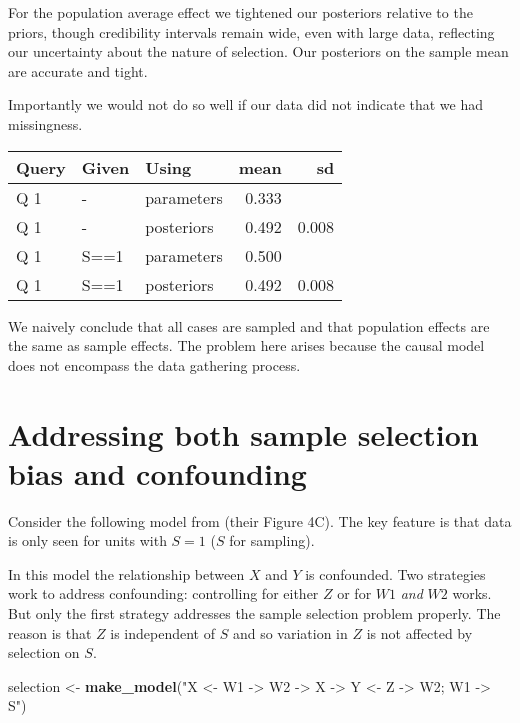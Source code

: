 \documentclass[
  12pt,
]{book}
\newenvironment{Shaded}{\begin{snugshade}}{\end{snugshade}}
\newcommand{\KeywordTok}[1]{\textcolor[rgb]{0.13,0.29,0.53}{\textbf{#1}}}
\newcommand{\NormalTok}[1]{#1}
\newcommand{\StringTok}[1]{\textcolor[rgb]{0.31,0.60,0.02}{#1}}
\begin{document}
For the population average effect we tightened our posteriors relative to the priors, though credibility intervals remain wide, even with large data, reflecting our uncertainty about the nature of selection. Our posteriors on the sample mean are accurate and tight.

Importantly we would not do so well if our data did not indicate that we had missingness.

\begin{tabular}{l|l|l|r|r}
\hline
Query & Given & Using & mean & sd\\
\hline
Q 1 & - & parameters & 0.333 & \\
\hline
Q 1 & - & posteriors & 0.492 & 0.008\\
\hline
Q 1 & S==1 & parameters & 0.500 & \\
\hline
Q 1 & S==1 & posteriors & 0.492 & 0.008\\
\hline
\end{tabular}

We naively conclude that all cases are sampled and that population effects are the same as sample effects. The problem here arises because the causal model does not encompass the data gathering process.

\hypertarget{addressing-both-sample-selection-bias-and-confounding}{%
\section{Addressing both sample selection bias and confounding}\label{addressing-both-sample-selection-bias-and-confounding}}

Consider the following model from \citet{bareinboim2016causal} (their Figure 4C). The key feature is that data is only seen for units with \(S=1\) (\(S\) for sampling).

In this model the relationship between \(X\) and \(Y\) is confounded. Two strategies work to address confounding: controlling for either \(Z\) or for \(W1\) \emph{and} \(W2\) works. But only the first strategy addresses the sample selection problem properly. The reason is that \(Z\) is independent of \(S\) and so variation in \(Z\) is not affected by selection on \(S\).

\begin{Shaded}
\begin{Highlighting}[]
\NormalTok{selection <-}\StringTok{ }\KeywordTok{make_model}\NormalTok{(}\StringTok{"X <- W1 -> W2 -> X -> Y <- Z -> W2; W1 -> S"}\NormalTok{)}
\end{Highlighting}
\end{Shaded}
\end{document}
